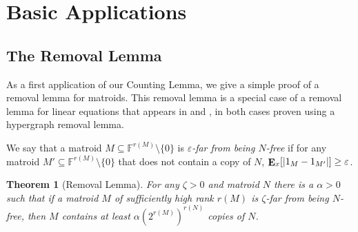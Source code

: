 \documentclass{article}
\theoremstyle{plain}
\newtheorem{thm}[theorem]{Theorem}
\theoremstyle{definition}
\theoremstyle{definition}
\theoremstyle{remark}
\numberwithin{equation}{section}
\newcommand{\FF}{\mathbb{F}}
\newcommand{\Esymb}{{\bf E}}
\DeclareMathOperator*{\E}{\Esymb}
\begin{document}
\section{Basic Applications} \label{sec:apply}
\subsection{The Removal Lemma}
As a first application of our Counting Lemma, we give a simple proof of a removal lemma for matroids. This removal lemma is a special case of a removal lemma for linear equations that appears in \cite{hyperRemoval} and \cite{MatroidRemoval}, in both cases proven using a hypergraph removal lemma.

We say that a matroid $M\subseteq \FF^{r(M)}\setminus \{0\}$ is \emph{$\varepsilon$-far from being $N$-free} if for any matroid $M'\subseteq \FF^{r(M)}\setminus \{0\}$ that does not contain a copy of $N$, $\E_x[|1_M-1_{M'}|]\geq \varepsilon$.

\begin{thm}[Removal Lemma]
For any $\zeta>0$ and matroid $N$ there is a $\alpha>0$ such that if a matroid $M$ of sufficiently high rank $r(M)$ is $\zeta$-far from being $N$-free, then $M$ contains at least $\alpha (2^{r(M)})^{r(N)}$ copies of $N$.
\end{thm}
\end{document}
